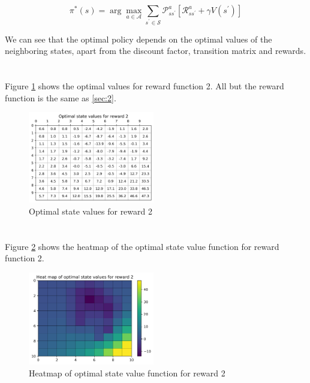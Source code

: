 \begin{equation}
\label{eq: optimal-policy}
     \pi^{*}(s)=\arg \max _{a \in \mathcal{A}} \sum_{s^{\prime} \in \mathcal{S}} \mathcal{P}_{s s^{\prime}}^{a}\left[\mathcal{R}_{s s^{\prime}}^{a}+\gamma V\left(s^{\prime}\right)\right]
\end{equation}

We can see that the optimal policy depends on the optimal values of the neighboring
states, apart from the discount factor, transition matrix and rewards.
\newpage

\section{}\label{sec:6}
Figure \ref{fig: matrix2} shows the optimal values for reward function 2. All but the reward function is the same as \ref{sec:2}.

\begin{figure}[!htb]
\centering
  \includegraphics[width=0.49\textwidth]{images/Q1-9/Optimal-state-values-for-reward-2.png}
  \caption{Optimal state values for reward 2}
\label{fig: matrix2}
\end{figure}

\section{}\label{sec:7}
Figure \ref{fig: heatmap3} shows the heatmap of the optimal state value function for reward function 2.

\begin{figure}[!htb]
\centering
  \includegraphics[width=0.49\textwidth]{images/Q1-9/Heat-map-of-optimal-state-values-for-reward-2.png}
  \caption{Heatmap of optimal state value function for reward 2}
\label{fig: heatmap3}
\end{figure}


